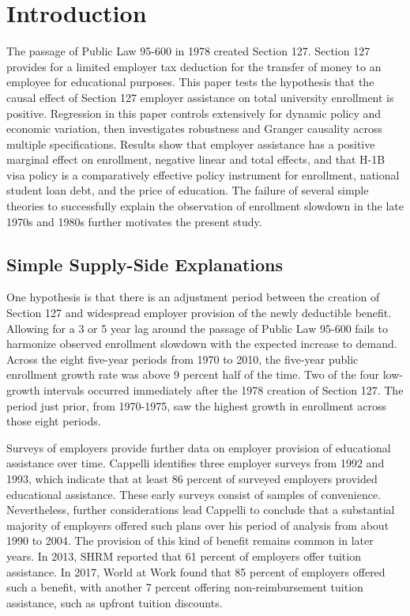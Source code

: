 \documentclass[review]{elsarticle}
\begin{document}
\pagebreak
\linenumbers

\section{Introduction}
The passage of Public Law 95-600 in 1978 created Section 127\cite{plaw95_600_1978}.
Section 127 provides for a limited employer tax deduction for the transfer of money to an employee for educational purposes.
This paper tests the hypothesis that the causal effect of Section 127 employer assistance on total university enrollment is positive.
Regression in this paper controls extensively for dynamic policy and economic variation,
then investigates robustness and Granger causality across multiple specifications.
Results show that employer assistance has a positive marginal effect on enrollment,
negative linear and total effects,
and that H-1B visa policy is a comparatively effective policy instrument for enrollment,
national student loan debt, and the price of education.
The failure of several simple theories to successfully explain the observation of enrollment slowdown in the late 1970s and 1980s further motivates the present study.

\subsection{Simple Supply-Side Explanations}
One hypothesis is that there is an adjustment period between the creation of Section 127 and widespread employer provision of the newly deductible benefit.
Allowing for a 3 or 5 year lag around the passage of Public Law 95-600 fails to harmonize observed enrollment slowdown with the expected increase to demand.
Across the eight five-year periods from 1970 to 2010, the five-year public enrollment growth rate was above 9 percent half of the time.
Two of the four low-growth intervals occurred immediately after the 1978 creation of Section 127.
The period just prior, from 1970-1975, saw the highest growth in enrollment across those eight periods.

Surveys of employers provide further data on employer provision of educational assistance over time.
Cappelli identifies three employer surveys from 1992 and 1993, which indicate that at least 86 percent of surveyed employers provided educational assistance\cite{cappelli2004employers}.
These early surveys consist of samples of convenience.
Nevertheless, further considerations lead Cappelli to conclude that a substantial majority of employers offered such plans over his period of analysis from about 1990 to 2004.
The provision of this kind of benefit remains common in later years.
In 2013, SHRM reported that 61 percent of employers offer tuition assistance\cite{cherry2014rejuvenating}.
In 2017, World at Work found that 85 percent of employers offered such a benefit,
with another 7 percent offering non-reimbursement tuition assistance, such as upfront tuition discounts\cite{talentculture_2018}.
\end{document}
